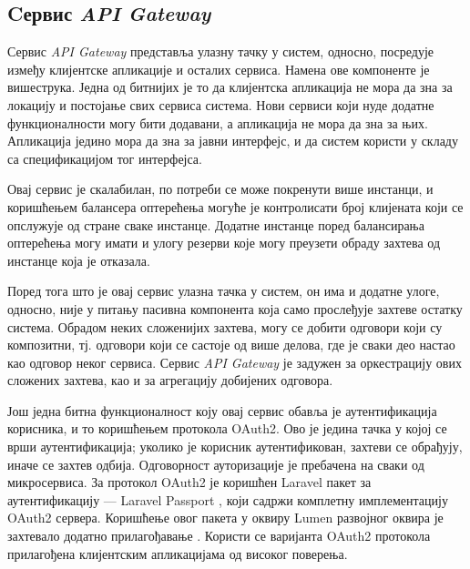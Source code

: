 \documentclass[12pt,oneside]{memoir}
\begin{document}
\subsection{Cервис \textit{API Gateway}}
Сервис \textit{API Gateway} представља улазну тачку у систем, односно, посредује између клијентске апликације и осталих сервиса. Намена ове компоненте је вишеструка. Једна од битнијих је то да клијентска апликација не мора да зна за локацију и постојање свих сервиса система. Нови сервиси који нуде додатне функционалности могу бити додавани, а апликација не мора да зна за њих. Апликација једино мора да зна за јавни интерфејс, и да систем користи у складу са спецификацијом тог интерфејса.

Овај сервис је скалабилан, по потреби се може покренути више инстанци, и коришћењем балансера оптерећења могуће је контролисати број клијената који се опслужује од стране сваке инстанце. Додатне инстанце поред балансирања оптерећења могу имати и улогу резерви које могу преузети обраду захтева од инстанце која је отказала.

Поред тога што је овај сервис улазна тачка у систем, он има и додатне улоге, односно, није у питању пасивна компонента која само прослеђује захтеве остатку система. Обрадом неких сложенијих захтева, могу се добити одговори који су композитни, тј. одговори који се састоје од више делова, где је сваки део настао као одговор неког сервиса. Сервис \textit{API Gateway} је задужен за оркестрацију ових сложених захтева, као и за агрегацију добијених одговора.

Још једна битна функционалност коју овај сервис обавља је аутентификација корисника, и то коришћењем протокола OAuth2. Ово је једина тачка у којој се врши аутентификација; уколико је корисник аутентификован, захтеви се обрађују, иначе се захтев одбија. Одговорност ауторизације је пребачена на сваки од микросервиса. За протокол OAuth2 је коришћен Laravel пакет за аутентификацију --- Laravel Passport \cite{laravel_passport}, који садржи комплетну имплементацију OAuth2 сервера. Коришћење овог пакета у оквиру Lumen развојног оквира је захтевало додатно прилагођавање \cite{laravel_passport_in_lumen}. Користи се варијанта OAuth2 протокола прилагођена клијентским апликацијама од високог поверења.
\end{document}
